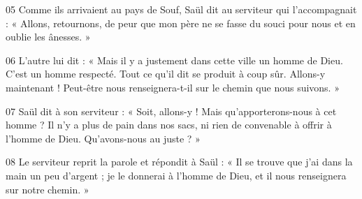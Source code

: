 
05 Comme ils arrivaient au pays de Souf, Saül dit au serviteur qui l’accompagnait : « Allons, retournons, de peur que mon père ne se fasse du souci pour nous et en oublie les ânesses. »

06 L’autre lui dit : « Mais il y a justement dans cette ville un homme de Dieu. C’est un homme respecté. Tout ce qu’il dit se produit à coup sûr. Allons-y maintenant ! Peut-être nous renseignera-t-il sur le chemin que nous suivons. »

07 Saül dit à son serviteur : « Soit, allons-y ! Mais qu’apporterons-nous à cet homme ? Il n’y a plus de pain dans nos sacs, ni rien de convenable à offrir à l’homme de Dieu. Qu’avons-nous au juste ? »

08 Le serviteur reprit la parole et répondit à Saül : « Il se trouve que j’ai dans la main un peu d’argent ; je le donnerai à l’homme de Dieu, et il nous renseignera sur notre chemin. »
